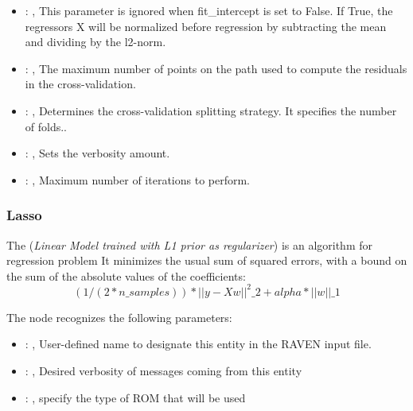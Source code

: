\begin{itemize}
    \item {}: , 
      This parameter is ignored when fit\_intercept is set to False. If True,
      the regressors X will be normalized before regression by subtracting the mean and
      dividing by the l2-norm.

    \item {}: , 
      The maximum number of points on the path used to compute the
      residuals in the cross-validation.

    \item {}: , 
      Determines the cross-validation splitting strategy.
      It specifies the number of folds..

    \item {}: , 
      Sets the verbosity amount.

    \item {}: , 
      Maximum number of iterations to perform.
  \end{itemize}


\subsubsection{Lasso}
  The  (\textit{Linear Model trained with L1 prior as regularizer})
  is an algorithm for regression problem                         It minimizes the usual sum of
  squared errors, with a bound on the sum of the                         absolute values of the
  coefficients:                         \begin{equation}                          (1 / (2 *
  n\_samples)) * ||y - Xw||^2\_2 + alpha * ||w||\_1                         \end{equation}

  The  node recognizes the following parameters:
    \begin{itemize}
      \item {}: , 
        User-defined name to designate this entity in the RAVEN input file.
      \item {}: , 
        Desired verbosity of messages coming from this entity
      \item {}: , 
        specify the type of ROM that will be used
  \end{itemize}

